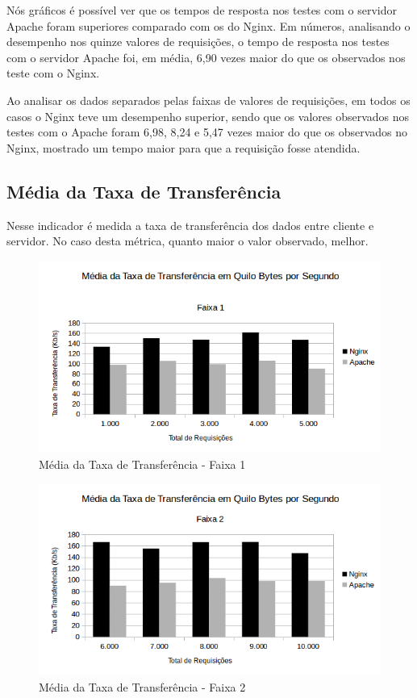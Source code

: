 Nós gráficos é possível ver que os tempos de resposta nos testes com o servidor 
Apache foram superiores comparado com os do Nginx. Em números, analisando o 
desempenho nos quinze valores de requisições, o tempo de resposta nos testes 
com o servidor Apache foi, em média, 6,90 vezes maior do que os observados nos 
teste com o Nginx.

Ao analisar os dados separados pelas faixas de valores de requisições, em todos 
os casos o Nginx teve um desempenho superior, sendo que os valores observados 
nos testes com o Apache foram 6,98, 8,24 e 5,47 vezes maior do que os 
observados no Nginx, mostrado um tempo maior para que a requisição fosse 
atendida.

\subsection{Média da Taxa de Transferência}
Nesse indicador é medida a taxa de transferência dos dados entre cliente e 
servidor. No caso desta métrica, quanto maior o valor observado, melhor.

\begin{figure}[H]
	\centering
	\includegraphics[width=1\linewidth]{graficos/grafico6-f1} 
	\caption{Média da Taxa de Transferência - Faixa 1}
	\label{fig:grafico6-f1}
\end{figure}

\begin{figure}[H]
	\centering
	\includegraphics[width=1\linewidth]{graficos/grafico6-f2} 
	\caption{Média da Taxa de Transferência - Faixa 2}
	\label{fig:grafico6-f2}
\end{figure}

